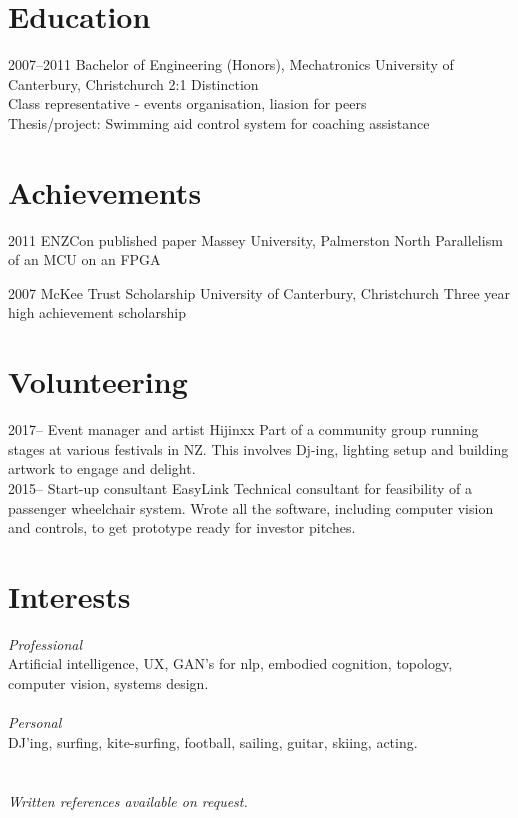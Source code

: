 \documentclass[print]{friggeri-cv} %
\begin{document}
\section{Education}
\begin{entrylist}
\entry
{2007--2011}
{Bachelor of Engineering (Honors), Mechatronics}
{University of Canterbury, Christchurch}
{2:1 Distinction\\
Class representative - events organisation, liasion for peers\\
Thesis/project: Swimming aid control system for coaching assistance}

\end{entrylist}
\section{Achievements}
\begin{entrylist}
\entry
{2011}
{ENZCon published paper}
{Massey University, Palmerston North}
{Parallelism of an MCU on an FPGA}

\entry
{2007}
{McKee Trust Scholarship}
{University of Canterbury, Christchurch}
{Three year high achievement scholarship}
\end{entrylist}

\section{Volunteering}
\begin{entrylist}
\entry 
{2017-- }
{Event manager and artist}
{Hijinxx}
{Part of a community group running stages at various festivals in NZ. This involves Dj-ing, lighting setup and building artwork to engage and delight.} \\
\entry
{2015--}
{Start-up consultant}
{EasyLink}
{Technical consultant for feasibility of a passenger wheelchair system. Wrote all the software, including computer vision and controls, to get prototype ready for investor pitches.}
\end{entrylist}

\section{Interests}
\emph{Professional}\\ Artificial intelligence, UX, GAN's for nlp, embodied cognition, topology, computer vision, systems design.\\
\\
\emph{Personal}\\ DJ'ing, surfing, kite-surfing, football, sailing, guitar, skiing, acting.
\\ \\ \\ 
\emph{Written references available on request.}
\end{document}
